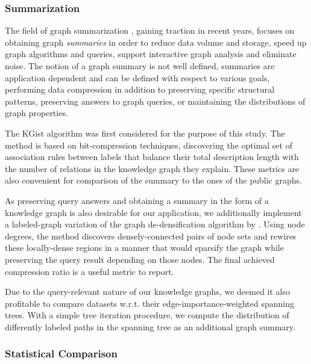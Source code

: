 \subsubsection{Summarization}

The field of graph summarization \cite{liu_graph_2019}, gaining traction in recent years, focuses on obtaining graph \emph{summaries} in order to reduce data volume and storage, speed up graph algorithms and queries, support interactive graph analysis and eliminate noise. The notion of a graph summary is not well defined, summaries are application dependent and can be defined with respect to various goals, performing data compression in addition to preserving specific structural patterns, preserving answers to graph queries, or maintaining the distributions of graph properties. 

The KGist algorithm \cite{belth_what_2020} was first considered for the purpose of this study. The method is based on bit-compression techniques, discovering the optimal set of association rules between labels that balance their total description length with the number of relations in the knowledge graph they explain. These metrics are also convenient for comparison of the summary to the ones of the public graphs.

As preserving query answers and obtaining a summary in the form of a knowledge graph is also desirable for our application, we additionally implement a labeled-graph variation of the graph de-densification algorithm by \cite{maccioni_scalable_2016}. Using node degrees, the method discovers densely-connected pairs of node sets and rewires these locally-dense regions in a manner that would sparsify the graph while preserving the query result depending on those nodes. The final achieved compression ratio is a useful metric to report. 

Due to the query-relevant nature of our knowledge graphs, we deemed it also profitable to compare datasets w.r.t. their edge-importance-weighted spanning trees. With a simple tree iteration procedure, we compute the distribution of differently labeled paths in the spanning tree as an additional graph summary.

\subsubsection{Statistical Comparison}

